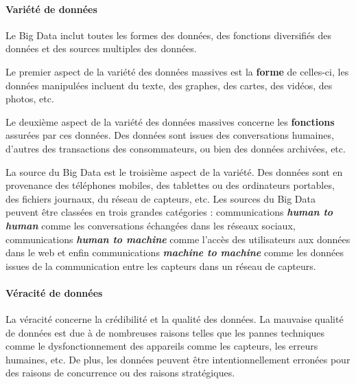 		
		
		
		
		\paragraph{Variété de données} \label{variete-data}
		
		Le Big Data inclut toutes les formes des données, des fonctions diversifiés des données et des sources multiples des données.
		
		Le premier aspect de la variété  des données massives est la \textbf{forme} de celles-ci, les données manipulées incluent du texte, des graphes, des cartes, des vidéos, des photos, etc.
		
		Le deuxième aspect de la variété des données massives concerne les \textbf{fonctions} assurées par ces données. Des données sont issues des conversations humaines, d'autres des transactions des consommateurs, ou bien des données archivées, etc.
		
		La source du Big Data est le troisième aspect de la variété. Des données sont en provenance des téléphones mobiles, des tablettes ou des ordinateurs portables, des fichiers journaux, du réseau de capteurs, etc. Les sources du Big Data peuvent être classées en trois grandes catégories : communications \textbf{\textit{human to human}} comme les conversations échangées dans les réseaux sociaux, communications \textbf{\textit{ human to machine}} comme l'accès des utilisateurs aux données dans le web et enfin communications \textbf{\textit{machine to machine}} comme les données issues de la communication entre les capteurs dans un réseau de capteurs.
		
		
		
		\paragraph{Véracité de données}
		
		La véracité concerne la crédibilité et la qualité des données. La mauvaise qualité de données est due à de nombreuses raisons telles que les pannes techniques comme le dysfonctionnement des appareils comme les capteurs, les erreurs humaines,  etc. De plus, les données peuvent être intentionnellement erronées pour des raisons de concurrence ou des raisons stratégiques.
	
